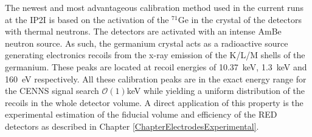The newest and most advantageous calibration method used in the current runs at the IP2I is based on the activation of the $^{71}$Ge in the crystal of the detectors with thermal neutrons. The detectors are activated with an intense AmBe neutron source. As such, the germanium crystal acts as a radioactive source generating electronics recoils from the x-ray emission of the K/L/M shells of the germanium. These peaks are located at recoil energies of \SI{10.37}{\kilo\eV}, \SI{1.3}{\kilo\eV} and \SI{160}{\eV} respectively. All these calibration peaks are in the exact energy range for the CENNS signal search $\mathcal{O}(1)$\si{\kilo\eV} while yielding a uniform distribution of the recoils in the whole detector volume. A direct application of this property is the experimental estimation of the fiducial volume and efficiency of the RED detectors as described in Chapter \ref{ChapterElectrodesExperimental}.



%
%
%
